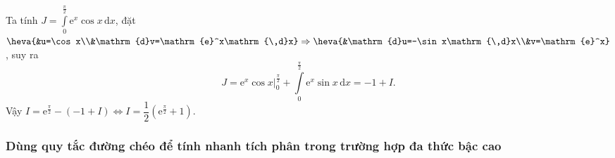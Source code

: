 \begin{ex}
{\begin{enumerate}[a)]
			Ta tính $\displaystyle J=\int\limits_0^{\frac{\pi}{2}}\mathrm{e}^x\cos x\mathrm{\,d}x$, đặt $\heva{&u=\cos x\\&\mathrm{d}v=\mathrm{e}^x\mathrm{\,d}x}\Rightarrow\heva{&\mathrm{d}u=-\sin x\mathrm{\,d}x\\&v=\mathrm{e}^x}$, suy ra
			\[J=\left.\mathrm{e}^x\cos x\right|_0^{\frac{\pi}{2}}+\int\limits_{0}^{\frac{\pi}{2}}\mathrm{e}^x\sin x\mathrm{\,d}x=-1+I.\]
			Vậy $I=\mathrm{e}^{\frac{\pi}{2}}-(-1+I)\Leftrightarrow I=\dfrac{1}{2}\left(\mathrm{e}^{\frac{\pi}{2}}+1\right)$.
		\end{enumerate}
	}
\end{ex}
\subsubsection{Dùng quy tắc đường chéo để tính nhanh tích phân trong trường hợp đa thức bậc cao}
